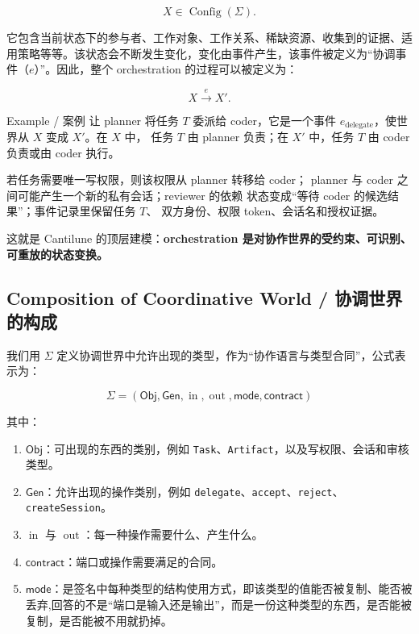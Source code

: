 \begin{equation}
  \boxed{X\in\operatorname{Config}(\Sigma).
  }\label{eq:coordinating-world-state}
\end{equation}

它包含当前状态下的参与者、工作对象、工作关系、稀缺资源、收集到的证据、适用策略等等。该状态会不断发生变化，变化由事件产生，该事件被定义为“协调事件（$e$）”。因此，整个 orchestration 的过程可以被定义为：

\begin{equation}
  \boxed{X\xrightarrow{e}X'}.
  \label{eq:coordinating-world-state-and-events}
\end{equation}

\begin{MWCallout}[MWCyan]{Example / 案例}
  让 planner 将任务 $T$ 委派给 coder，它是一个事件
  $e_{\mathrm{delegate}}$，使世界从 $X$ 变成 $X'$。在 $X$ 中，
  任务 $T$ 由 planner 负责；在 $X'$ 中，任务 $T$ 由 coder
  负责或由 coder 执行。

  若任务需要唯一写权限，则该权限从 planner 转移给 coder；
  planner 与 coder 之间可能产生一个新的私有会话；reviewer 的依赖
  状态变成“等待 coder 的候选结果”；事件记录里保留任务 $T$、
  双方身份、权限 token、会话名和授权证据。
\end{MWCallout}

这就是 Cantilune 的顶层建模：\textbf{orchestration 是对协作世界的受约束、可识别、可重放的状态变换。}

\subsection{ Composition of Coordinative World / 协调世界的构成}

我们用 $\Sigma$ 定义协调世界中允许出现的类型，作为“协作语言与类型合同”，公式表示为：

\begin{equation}
  \boxed{\Sigma
    =
    (\mathsf{Obj},\mathsf{Gen},
      \operatorname{in},\operatorname{out},
  \mathsf{mode},\mathsf{contract})}\label{eq:definition-of-sigma}
\end{equation}

其中：

\begin{enumerate}
  \item $\mathsf{Obj}$：可出现的东西的类别，例如 \texttt{Task}、\texttt{Artifact}，以及写权限、会话和审核类型。
  \item $\mathsf{Gen}$：允许出现的操作类别，例如 \texttt{delegate}、\texttt{accept}、\texttt{reject}、\texttt{createSession}。
  \item $\operatorname{in}$ 与 $\operatorname{out}$：每一种操作需要什么、产生什么。
  \item $\mathsf{contract}$：端口或操作需要满足的合同。
  \item $\mathsf{mode}$：是签名中每种类型的结构使用方式，即该类型的值能否被复制、能否被丢弃,回答的不是“端口是输入还是输出”，而是一份这种类型的东西，是否能被复制，是否能被不用就扔掉。
\end{enumerate}

